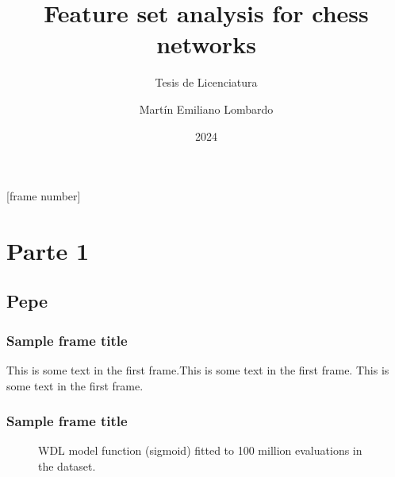 \usepackage{../common}

\title{Feature set analysis for chess  networks}
\subtitle{Tesis de Licenciatura}
\author{Martín Emiliano Lombardo}
\date{2024}

[frame number]{}



\frame{\titlepage}



\section{Parte 1}

\subsection{Pepe}

\begin{frame}
\frametitle{Sample frame title}
This is some text in the first frame.\pause This is some text in the first frame. This is some text in the first frame.
\end{frame}

\begin{frame}
\frametitle{Sample frame title}

\begin{figure}[H]
\centering
{}
\caption{WDL model function (sigmoid) fitted to 100 million evaluations in the dataset.}
\label{wdl-fit}
\end{figure}

\end{frame}

